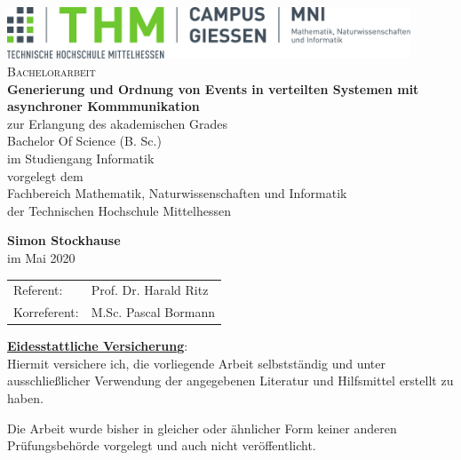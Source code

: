 \documentclass[%
	BCOR=8.25mm,         %
	DIV=12,              %
	parskip=half,				 %
	bibliography=totoc,	 %
	headsepline=on,      %
	openany,
	ngerman
	]{scrbook}
\begin{document}
\frontmatter

\begin{titlepage}
	\begin{center}
	\includegraphics[width=0.9\textwidth]{img/mni-logo}\\[5cm]
	\textsc{\Large Bachelorarbeit}\\[2cm]
	\textbf{\huge\sffamily Generierung und Ordnung von Events in verteilten Systemen mit asynchroner Kommmunikation}\\[2cm]
	
	zur Erlangung des akademischen Grades \\
	Bachelor Of Science (B. Sc.) \\
	\vspace{10px}
	im Studiengang Informatik\\
	\vspace{10px}
	vorgelegt dem\\
	Fachbereich Mathematik, Naturwissenschaften und Informatik\\ der Technischen Hochschule Mittelhessen
	
	\textbf{Simon Stockhause}\\ [1.5cm] 
	im Mai 2020
	\end{center}
	\center
	\begin{tabular}{ll}
		Referent: & Prof. Dr. Harald Ritz\\ 
		Korreferent: & M.Sc. Pascal Bormann\\ 
	\end{tabular}
\end{titlepage}
\cleardoubleemptypage

\pagestyle{empty}
{
	\renewcommand{\thispagestyle}[1]{}
	\underline{\textbf{Eidesstattliche Versicherung}}:\\
	Hiermit versichere ich, die vorliegende Arbeit selbstständig und unter
	ausschließlicher Verwendung der angegebenen Literatur und Hilfsmittel erstellt zu
	haben.
	
	Die Arbeit wurde bisher in gleicher oder ähnlicher Form keiner anderen
	Prüfungsbehörde vorgelegt und auch nicht veröffentlicht.
	
}
\clearpage
\pagestyle{plain}
\end{document}
